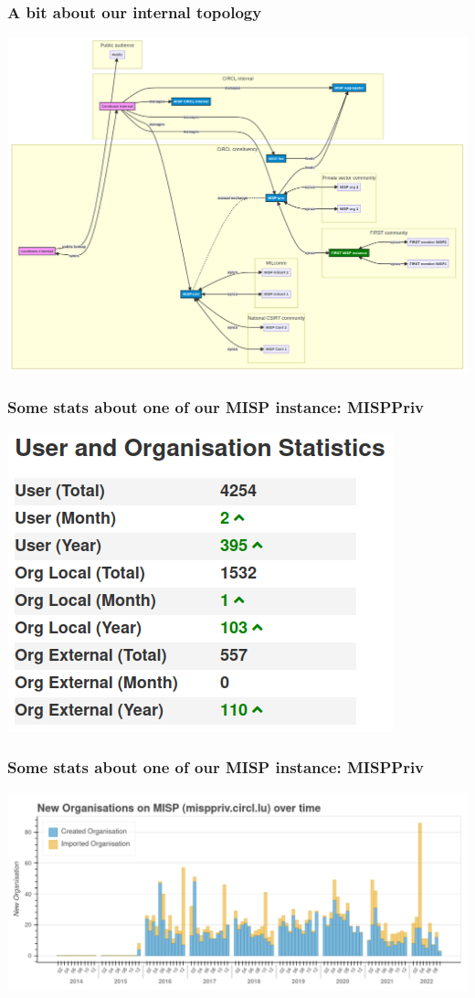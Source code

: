 \begin{frame}
\frametitle{A bit about our internal topology}
    \includegraphics[width=0.45\linewidth]{pictures/topology.png}
\end{frame}

\begin{frame}
    \frametitle{Some stats about one of our MISP instance: MISPPriv}
    \includegraphics[width=0.45\linewidth]{pictures/misppriv-user-org-stats.png}
\end{frame}

\begin{frame}
    \frametitle{Some stats about one of our MISP instance: MISPPriv}
    \begin{center}
        \includegraphics[width=1.0\linewidth]{pictures/bokeh_new_org.png}
    \end{center}
\end{frame}


